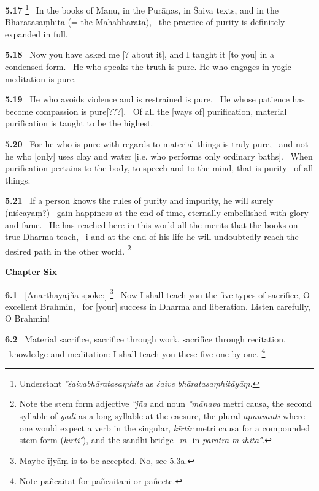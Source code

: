 \documentclass{article}
\newcommand{\skt}[1]{\textit{#1}}
\begin{document}
\textbf{5.17}%
\footnote{Understant \skt{°śaivabhāratasaṃhite} as  \skt{śaive bhāratasaṃhitāyāṃ}.  }%
\ In the books of Manu, in the Purāṇas, in Śaiva texts, and in the Bhāratasaṃhitā (= the Mahābhārata),%
\                  the practice of purity is definitely expanded in full.%


\textbf{5.18}%
\ Now you have asked me [? about it], and I taught it [to you] in a condensed form.%
\                  He who speaks the truth is pure. He who engages in yogic meditation is pure.%


\textbf{5.19}%
\ He who avoids violence and is restrained is pure.%
\                 He whose patience has become compassion is pure[???].%
\ Of all the [ways of] purification, material purification is taught to be the highest.%


\textbf{5.20}%
\ For he who is pure with regards to material things is truly pure,%
\                 and not he who [only] uses clay and water [i.e. who performs only ordinary baths].%
\                 When purification pertains to the body, to speech and to the mind, that is purity%
\                 of all things.%


\textbf{5.21}%
\ If a person knows the rules of purity and impurity, he will surely (niścayaṃ?)%
\                 gain happiness at the end of time, eternally embellished with glory and fame.%
\                 He has reached here in this world all the merits that the books on true Dharma teach,%
\         i       and at the end of his life he will undoubtedly reach the desired path in the other world.%
\footnote{Note the stem form adjective \skt{°jña} and noun \skt{°mānava} metri causa,                 the second syllable of \skt{yadi} as a long syllable at the caesure, the plural \skt{āpnuvanti} where one would expect a verb                    in the singular, \skt{kīrtir} metri causa for a compounded stem form (\skt{kīrti°}),                and the sandhi-bridge \skt{-m-} in \skt{paratra-m-īhita°}.  }%
\vfill\pagebreak\begin{center}{\large\textbf{ Chapter Six 
}}\end{center}


\textbf{6.1}%
\ [Anarthayajña spoke:]%
\footnote{Maybe ījyāṃ is to be accepted. No, see 5.3a. }%
\ Now I shall teach you the five types of sacrifice, O excellent Brahmin,%
\                       for [your] success in Dharma and liberation. Listen carefully, O Brahmin!%


\textbf{6.2}%
\ Material sacrifice, sacrifice through work, sacrifice through recitation,%
\                         knowledge and meditation: I shall teach you these five one by one.%
\footnote{Note pañcaitat for pañcaitāni or pañcete. }%
\end{document}
